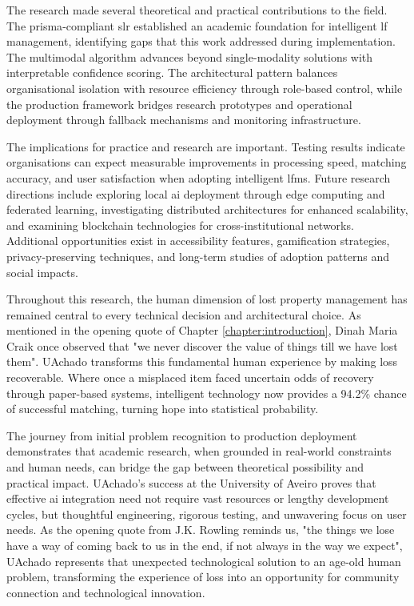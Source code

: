 The research made several theoretical and practical contributions to the field. The \ac{prisma}-compliant \ac{slr} established an academic foundation for intelligent \ac{lf} management, identifying gaps that this work addressed during implementation. The multimodal algorithm advances beyond single-modality solutions with interpretable confidence scoring. The architectural pattern balances organisational isolation with resource efficiency through role-based control, while the production framework bridges research prototypes and operational deployment through fallback mechanisms and monitoring infrastructure.

The implications for practice and research are important. Testing results indicate organisations can expect measurable improvements in processing speed, matching accuracy, and user satisfaction when adopting intelligent \ac{lfms}. Future research directions include exploring local \ac{ai} deployment through edge computing and federated learning, investigating distributed architectures for enhanced scalability, and examining blockchain technologies for cross-institutional networks. Additional opportunities exist in accessibility features, gamification strategies, privacy-preserving techniques, and long-term studies of adoption patterns and social impacts.

Throughout this research, the human dimension of lost property management has remained central to every technical decision and architectural choice. As mentioned in the opening quote of Chapter \ref{chapter:introduction}, Dinah Maria Craik once observed that "we never discover the value of things till we have lost them". UAchado transforms this fundamental human experience by making loss recoverable. Where once a misplaced item faced uncertain odds of recovery through paper-based systems, intelligent technology now provides a 94.2\% chance of successful matching, turning hope into statistical probability.

The journey from initial problem recognition to production deployment demonstrates that academic research, when grounded in real-world constraints and human needs, can bridge the gap between theoretical possibility and practical impact. UAchado's success at the University of Aveiro proves that effective \ac{ai} integration need not require vast resources or lengthy development cycles, but thoughtful engineering, rigorous testing, and unwavering focus on user needs. As the opening quote from J.K. Rowling reminds us, "the things we lose have a way of coming back to us in the end, if not always in the way we expect", UAchado represents that unexpected technological solution to an age-old human problem, transforming the experience of loss into an opportunity for community connection and technological innovation.

